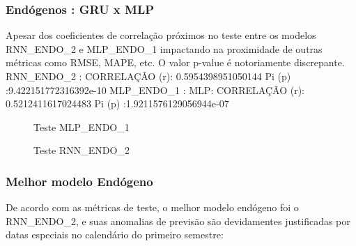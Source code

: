 \documentclass[	12pt, Times, openright, twoside, a4paper, english, brazil]{abntex2}
\begin{document}
    	    \subsubsection{Endógenos : GRU x MLP}
            Apesar dos coeficientes de correlação próximos no teste entre os modelos RNN\_ENDO\_2 e MLP\_ENDO\_1 impactando na proximidade de outras métricas como RMSE, MAPE, etc. O valor p-value é notoriamente discrepante.\newline
            RNN\_ENDO\_2 : CORRELAÇÃO (r): 0.5954398951050144 Pi (p) :9.422151772316392e-10\newline
            MLP\_ENDO\_1 : MLP: CORRELAÇÃO (r): 0.5212411617024483 Pi (p) :1.9211576129056944e-07 \newline
            \begin{figure}[!ht]
              \caption{Teste MLP\_ENDO\_1 \label{fig:case1_mlp_endo1_test} }
            \end{figure}

            \begin{figure}[!ht]
              \caption{Teste RNN\_ENDO\_2 \label{fig:case1_rnn_endo2_test} }
            \end{figure}

    	    \subsubsection{Melhor modelo Endógeno}
            De acordo com as métricas de teste, o melhor modelo endógeno foi o RNN\_ENDO\_2, e suas anomalias de previsão são devidamentes justificadas por datas especiais no calendário do primeiro semestre:
            
\end{document}

